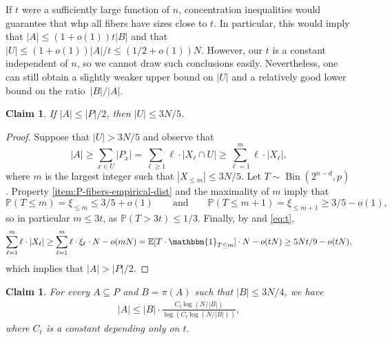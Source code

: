\documentclass[11pt,a4paper,oneside,reqno]{amsart}
\newtheorem{claim}[theorem]{Claim}
\newcommand{\PP}{\mathbb{P}}
\DeclareMathOperator{\Bin}{Bin}
\def\1{\mathbbm{1}}
\begin{document}
If $t$ were a sufficiently large function of $n$, concentration inequalities would guarantee that whp all fibers have sizes close to $t$.  In particular, this would imply that $|A| \le (1+o(1))t|B|$ and that $|U| \le (1+o(1))|A|/t \le (1/2+o(1))N$.  However, our $t$ is a constant independent of $n$, so we cannot draw such conclusions easily.  Nevertheless, one can still obtain a slightly weaker upper bound on $|U|$ and a relatively good lower bound on the ratio~$|B| / |A|$.


\begin{claim}\label{clm:U}
  If $|A| \leq |P|/2$, then $|U| \leq 3N/5$.
\end{claim}

\begin{proof}
  Suppose that $|U| > 3N/5$ and observe that
  \[
    |A| \ge \sum_{x \in U} |P_x| = \sum_{\ell \ge 1} \ell \cdot |X_\ell \cap U| \ge \sum_{\ell = 1}^m \ell \cdot |X_\ell|,
  \]
  where $m$ is the largest integer such that $|X_{\le m}| \le 3N/5$.
  Let $T \sim \Bin(2^{n-d}, p)$.
  Property \ref{item:P-fibers-empirical-dist} and the maximality of $m$ imply that
  \[
    \PP(T \le m) = \xi_{\le m} \le 3/5 + o(1)
    \qquad
    \text{and}
    \qquad
    \PP(T \le m+1) = \xi_{\le m+1} \ge 3/5 - o(1),
  \]
  so in particular $m \le 3t$, as $\PP(T > 3t) \le 1/3$.
  Finally, by  and \eqref{eq:t},
  \[
    \sum_{\ell=1}^m \ell \cdot |X_\ell| \ge \sum_{\ell=1}^m \ell \cdot \xi_\ell \cdot N - o(mN) = \mathbb{E}[T \cdot \1_{T \le m}] \cdot N - o(tN) \ge 5Nt/9 - o(tN),
  \]
  which implies that $|A| > |P|/2$.
\end{proof}

\begin{claim}\label{clm:B}
  For every $A \subseteq P$ and $B = \pi(A)$ such that $|B| \leq 3N / 4$, we have
  \begin{align*}
    |A| \leq |B| \cdot \frac{C_t \log ( N/|B|)}{\log \left(C_t\log\left(N/|B|\right)\right)},
  \end{align*}
  where $C_t$ is a constant depending only on $t$.
\end{claim}
\end{document}
